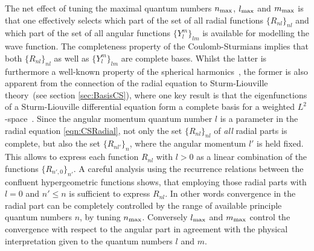 The net effect of tuning the maximal quantum numbers $n_\text{max}$, $l_\text{max}$ and $m_\text{max}$
is that one effectively selects which part
of the set of all radial functions $\{R_{nl}\}_{nl}$
and which part of the set of all angular functions $\{Y_l^m\}_{lm}$
is available for modelling the wave function.
The completeness property of the Coulomb-Sturmians
implies that both $\{R_{nl}\}_{nl}$
as well as $\{Y_l^m\}_{lm}$ are complete bases.
Whilst the latter is furthermore
a well-known property of the spherical harmonics~\cite{Avery2018},
the former is also apparent from the connection of the \CS radial equation
to Sturm-Liouville theory~(see section \vref{sec:BasisCS}),
where one key result is that the eigenfunctions of a Sturm-Liouville
differential equation form a complete basis for a weighted $L^2$-space~\cite{Avery2006}.
Since the angular momentum quantum number $l$
is a parameter in the \CS radial equation \eqref{eqn:CSRadial},
not only the set $\{R_{nl}\}_{nl}$ of \emph{all} radial parts is complete,
but also the set $\{R_{nl'}\}_{n}$, where the angular momentum $l'$ is held fixed.
This allows to express each function $R_{nl}$ with $l>0$
as a linear combination of the functions $\{R_{n',0}\}_{n'}$.
A careful analysis using the recurrence relations between the
confluent hypergeometric functions shows, that employing those radial parts
with $l=0$ and $n' \leq n$ is sufficient to express $R_{nl}$.
In other words convergence in the radial part can be completely controlled
by the range of available principle quantum numbers $n$,
\ie by tuning $n_\text{max}$.
Conversely $l_\text{max}$ and $m_\text{max}$ control the convergence with respect to the angular part
in agreement with the physical interpretation given to the quantum numbers $l$ and $m$.

